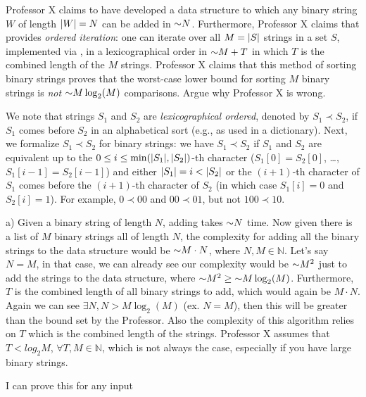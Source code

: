 \begin{problem}
\begin{questions}
\item Professor X claims to have developed a data structure  to which any binary string $W$ of length $\lvert W \rvert = N$ can be added in $\mathord{\sim}N$. Furthermore, Professor X claims that   provides \emph{ordered iteration}: one can iterate over all $M = \lvert S \rvert$ strings in a set $S$, implemented via , in a lexicographical order in $\mathord{\sim}M + T$ in which $T$ is the combined length of the $M$ strings. Professor X claims that this method of sorting binary strings proves that the worst-case lower bound for sorting $M$ binary strings is \emph{not} $\mathord{\sim}M \log_2(M)$ comparisons. Argue why Professor X is wrong.

We note that strings $S_1$ and $S_2$ are \emph{lexicographical ordered}, denoted by $S_1 \prec S_2$, if $S_1$ comes before $S_2$ in an alphabetical sort (e.g., as used in a dictionary). Next, we formalize $S_1 \prec S_2$ for binary strings: we have $S_1 \prec S_2$ if $S_1$ and $S_2$ are equivalent up to the $0\leq i \leq \min(\lvert S_1 \rvert, \lvert S_2 \rvert)$-th character ($S_1[0] = S_2[0]$,
\dots, $S_1[i-1] = S_2[i-1]$) and either $\lvert S_1 \rvert = i < \lvert S_2 \rvert$ or the $(i+1)$-th character of $S_1$ comes before the $(i+1)$-th character of $S_2$ (in which case $S_1[i] = 0$ and $S_2[i] = 1$). For example, $0 \prec 00$ and $00 \prec 01$, but not $100 \prec 10$. 

a) Given a binary string of length $N$, adding takes $\mathord{\sim}N$ time.
Now given there is a list of $M$ binary strings all of length $N$, the complexity for adding all the binary strings to the data structure would be $\mathord{\sim}M \cdot N$, where $N,M \in \mathbb{N}$. Let's say $N = M$, in that case, we can already see our complexity would be $\mathord{\sim}M^2$ just to add the strings to the data structure, where $\mathord{\sim}M^2 \geq \mathord{\sim}M \log_2(M)$.
Furthermore, $T$ is the combined length of all binary strings to add, which would again be $M \cdot N$. Again we can see $\exists N, N>M \log_2(M)$ (ex. $N = M$), then this will be greater than the bound set by the Professor.
Also the complexity of this algorithm relies on $T$ which is the combined length of the strings. Professor X assumes that $T < log_2{M}$, $\forall T,M \in \mathbb{N}$, which is not always the case, especially if you have large binary strings. 

I can prove this for any input

\end{questions}
\end{problem}

\SUBMITMSG{}
\DEFAULTGRADING{}

